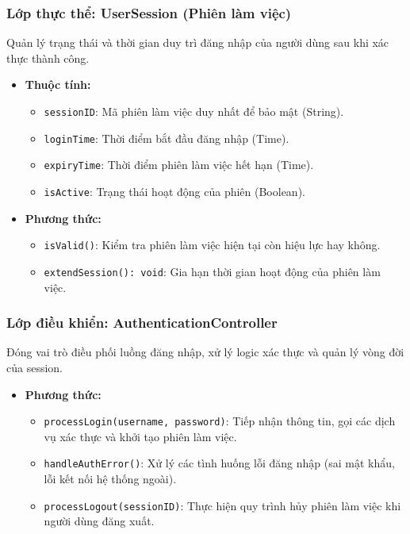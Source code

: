 \subsubsection{Lớp thực thể: UserSession (Phiên làm việc)}
Quản lý trạng thái và thời gian duy trì đăng nhập của người dùng sau khi xác thực thành công.

\begin{itemize}
    \item \textbf{Thuộc tính:}
    \begin{itemize}
        \item \texttt{sessionID}: Mã phiên làm việc duy nhất để bảo mật (String).
        \item \texttt{loginTime}: Thời điểm bắt đầu đăng nhập (Time).
        \item \texttt{expiryTime}: Thời điểm phiên làm việc hết hạn (Time).
        \item \texttt{isActive}: Trạng thái hoạt động của phiên (Boolean).
    \end{itemize}
    \item \textbf{Phương thức:}
    \begin{itemize}
        \item \texttt{isValid()}: Kiểm tra phiên làm việc hiện tại còn hiệu lực hay không.
        \item \texttt{extendSession(): void}: Gia hạn thời gian hoạt động của phiên làm việc.
    \end{itemize}
\end{itemize}

\subsubsection{Lớp điều khiển: AuthenticationController}
Đóng vai trò điều phối luồng đăng nhập, xử lý logic xác thực và quản lý vòng đời của session.

\begin{itemize}
    \item \textbf{Phương thức:}
    \begin{itemize}
        \item \texttt{processLogin(username, password)}: Tiếp nhận thông tin, gọi các dịch vụ xác thực và khởi tạo phiên làm việc.
        \item \texttt{handleAuthError()}: Xử lý các tình huống lỗi đăng nhập (sai mật khẩu, lỗi kết nối hệ thống ngoài).
        \item \texttt{processLogout(sessionID)}: Thực hiện quy trình hủy phiên làm việc khi người dùng đăng xuất.
    \end{itemize}
\end{itemize}

